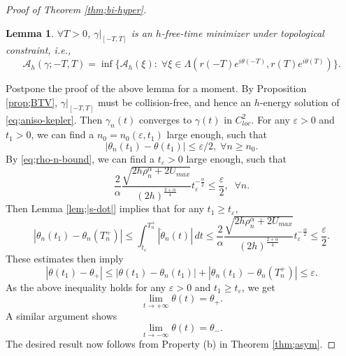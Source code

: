 \documentclass[11pt]{amsart}
\newcommand{\A}{\mathcal A}
\newcommand{\al}{\alpha}
\newcommand{\gm}{\gamma}
\newcommand{\ep}{\varepsilon}
\newcommand{\tht}{\theta}
\newcommand{\Lmd}{\Lambda}
\theoremstyle{plain}
\newtheorem{lem}{Lemma}[section]
\theoremstyle{definition}
\theoremstyle{remark}
\begin{document}
\begin{proof}[Proof of Theorem \ref{thm;bi-hyper}]
\begin{lem}
\label{lem;gm-free-minimizer-2}  $\forall T>0$, $\gm|_{[-T, T]}$ is an $h$-free-time minimizer under topological constraint, i.e.,
$$ \A_h(\gm; -T, T) = \inf \{ \A_h(\xi): \; \forall \xi \in \Lmd( r(-T) e^{i \tht(-T)}, r(T)e^{i \tht(T)}) \}. $$
\end{lem}
Postpone the proof of the above lemma for a moment. By Proposition \ref{prop;BTV},  $\gm|_{[-T, T]}$ must be collision-free, and hence an $h$-energy solution of \eqref{eq;aniso-kepler}. Then $\gm_n(t)$ converges to $\gm(t)$ in $C^2_{loc}$. For any $\ep>0$ and $t_1>0$, we can find a $n_0=n_0(\ep, t_1)$ large enough, such that 
$$ |\tht_n(t_1) -\tht(t_1)| \le \ep/2, \; \forall n \ge n_0. $$
By \eqref{eq;rho-n-bound}, we can find a $t_{\ep}>0$ large enough, such that 
$$ \frac{2}{\al} \frac{\sqrt{2h \rho_n^{\al} + 2U_{max}}}{(2h)^{\frac{2+\al}{4}}} t_{\ep}^{-\frac{\al}{2}} \le \frac{\ep}{2}, \;\; \forall n. $$
Then Lemma \ref{lem;|s-dot|} implies that for any $t_1 \ge t_{\ep}$, 
$$ |\tht_n(t_1)-\tht_n(T^+_n)| \le \int_{t_{\ep}}^{T_n^+} |\dot{\tht}_n(t)|\,dt \le  \frac{2}{\al} \frac{\sqrt{2h \rho_n^{\al} + 2U_{max}}}{(2h)^{\frac{2+\al}{4}}} t_{\ep}^{-\frac{\al}{2}} \le \frac{\ep}{2}.
$$
These estimates then imply
$$ |\tht(t_1)- \tht_+| \le |\tht(t_1) - \tht_n(t_1)| + |\tht_n(t_1)- \tht_n(T_n^+)| \le \ep. $$
As the above inequality holds for any $\ep>0$ and $t_1 \ge t_{\ep}$, we get 
$$ \lim_{t \to +\infty} \tht(t) = \tht_+. $$
A similar argument shows 
$$ \lim_{t \to -\infty} \tht(t) = \tht_-. $$
The desired result now follows from Property (b) in Theorem \ref{thm;asym}.
\end{proof}
\end{document}
